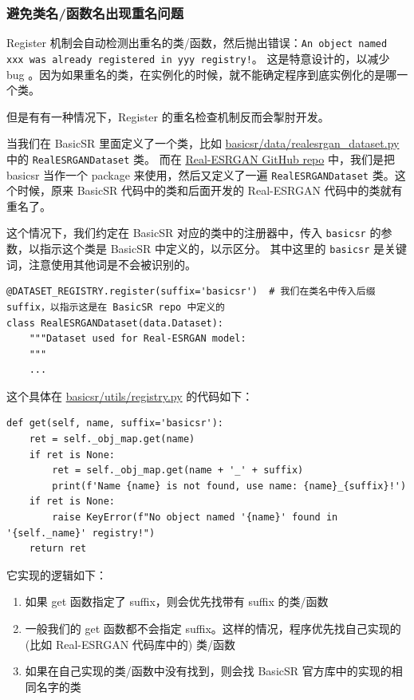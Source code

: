 \documentclass[../main.tex]{subfiles}
\begin{document}
\subsubsection{避免类名/函数名出现重名问题}\label{code_structure:avoid_repeated_name}

Register 机制会自动检测出重名的类/函数，然后抛出错误：\texttt{An object named xxx was already registered in yyy registry!}。
这是特意设计的，以减少 bug 。因为如果重名的类，在实例化的时候，就不能确定程序到底实例化的是哪一个类。

但是有有一种情况下，Register 的重名检查机制反而会掣肘开发。

当我们在 BasicSR 里面定义了一个类，比如 \href{https://github.com/XPixelGroup/BasicSR/blob/master/basicsr/data/realesrgan\_dataset.py}{basicsr/data/realesrgan\_dataset.py} 中的 \texttt{RealESRGANDataset} 类。
而在 \href{https://github.com/xinntao/Real-ESRGAN}{Real-ESRGAN GitHub repo} 中，我们是把 basicsr 当作一个 package 来使用，然后又定义了一遍 \texttt{RealESRGANDataset} 类。这个时候，原来 BasicSR 代码中的类和后面开发的 Real-ESRGAN 代码中的类就有重名了。

这个情况下，我们约定在 BasicSR 对应的类中的注册器中，传入 \texttt{basicsr} 的参数，以指示这个类是 BasicSR 中定义的，以示区分。
其中这里的 \texttt{basicsr} 是关键词，注意使用其他词是不会被识别的。
\begin{verbatim}
@DATASET_REGISTRY.register(suffix='basicsr')  # 我们在类名中传入后缀 suffix，以指示这是在 BasicSR repo 中定义的
class RealESRGANDataset(data.Dataset):
    """Dataset used for Real-ESRGAN model:
    """
    ...
\end{verbatim}

这个具体在 \href{https://github.com/XPixelGroup/BasicSR/blob/master/basicsr/utils/registry.py}{basicsr/utils/registry.py} 的代码如下：
\begin{verbatim}
def get(self, name, suffix='basicsr'):
    ret = self._obj_map.get(name)
    if ret is None:
        ret = self._obj_map.get(name + '_' + suffix)
        print(f'Name {name} is not found, use name: {name}_{suffix}!')
    if ret is None:
        raise KeyError(f"No object named '{name}' found in '{self._name}' registry!")
    return ret
\end{verbatim}
它实现的逻辑如下：
 \begin{enumerate}
    \item 如果 get 函数指定了 suffix，则会优先找带有 suffix 的类/函数
    \item 一般我们的 get 函数都不会指定 suffix。这样的情况，程序优先找自己实现的 (比如 Real-ESRGAN 代码库中的) 类/函数
    \item 如果在自己实现的类/函数中没有找到，则会找 BasicSR 官方库中的实现的相同名字的类
\end{enumerate}
\end{document}
